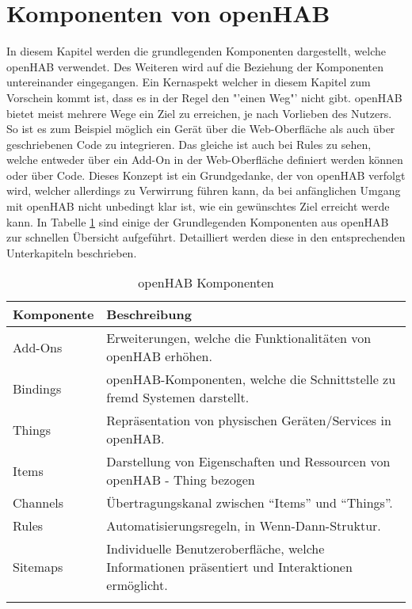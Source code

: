 \section{Komponenten von openHAB}\label{sec:technischeSicht}
In diesem Kapitel werden die grundlegenden Komponenten dargestellt, welche openHAB verwendet. Des Weiteren wird auf die  Beziehung der Komponenten untereinander eingegangen.
Ein Kernaspekt welcher in diesem Kapitel zum Vorschein kommt ist, dass es in der Regel den "'einen Weg"' nicht gibt. openHAB bietet meist mehrere Wege ein Ziel zu erreichen, je nach Vorlieben des Nutzers. So ist es zum Beispiel möglich ein Gerät über die Web-Oberfläche als auch über geschriebenen Code zu integrieren. Das gleiche ist auch bei Rules zu sehen, welche entweder über ein Add-On in der Web-Oberfläche definiert werden können oder über Code. Dieses Konzept ist ein Grundgedanke, der von openHAB verfolgt wird, welcher allerdings zu Verwirrung führen kann, da bei anfänglichen Umgang mit openHAB nicht unbedingt klar ist, wie ein gewünschtes Ziel erreicht werde kann.
In Tabelle \ref{table:openhub-components} sind einige der Grundlegenden Komponenten aus openHAB zur schnellen Übersicht aufgeführt. Detailliert werden diese in den entsprechenden Unterkapiteln beschrieben.

\begin{longtable}{| p{4cm} | p{11cm}|}
	\hline
	\textbf{Komponente} & \textbf{Beschreibung} \\
	\hline \hline
	\centering Add-Ons & Erweiterungen, welche die Funktionalitäten von openHAB erhöhen. \\
	\hline
	\centering Bindings & openHAB-Komponenten, welche die Schnittstelle zu fremd Systemen darstellt.  \\
	\hline
	\centering Things & Repräsentation von physischen Geräten/Services in openHAB. \\
	\hline
	\centering Items & Darstellung von Eigenschaften und Ressourcen von openHAB - Thing bezogen \\
	\hline
	\centering Channels & Übertragungskanal zwischen "`Items"' und "`Things"'. \\
	\hline
	\centering Rules & Automatisierungsregeln, in Wenn-Dann-Struktur.\\
	\hline
	\centering Sitemaps & Individuelle Benutzeroberfläche, welche Informationen präsentiert und Interaktionen ermöglicht.\\
	\hline
	\caption{openHAB Komponenten}
	\label{table:openhub-components}
\end{longtable}


